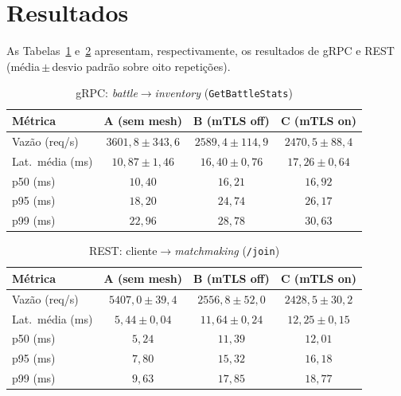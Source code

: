 \documentclass[12pt]{article}
\begin{document}
\section{Resultados}

As Tabelas~\ref{tab:grpc} e~\ref{tab:rest} apresentam, respectivamente, os resultados de gRPC e REST (m\'edia\,$\pm$\,desvio padr\~ao sobre oito repeti\c{c}\~oes).

\begin{table}[ht]
\centering
\caption{gRPC: \textit{battle}$\rightarrow$\textit{inventory} (\texttt{GetBattleStats})}
\label{tab:grpc}
\begin{tabular}{@{}lccc@{}}
\toprule
\textbf{M\'etrica} & \textbf{A (sem mesh)} & \textbf{B (mTLS off)} & \textbf{C (mTLS on)} \\
\midrule
Vaz\~ao (req/s)    & $3601{,}8 \pm 343{,}6$ & $2589{,}4 \pm 114{,}9$ & $2470{,}5 \pm 88{,}4$ \\
Lat.\ m\'edia (ms) & $10{,}87 \pm 1{,}46$   & $16{,}40 \pm 0{,}76$   & $17{,}26 \pm 0{,}64$ \\
p50 (ms)           & $10{,}40$              & $16{,}21$              & $16{,}92$ \\
p95 (ms)           & $18{,}20$              & $24{,}74$              & $26{,}17$ \\
p99 (ms)           & $22{,}96$              & $28{,}78$              & $30{,}63$ \\
\bottomrule
\end{tabular}
\end{table}

\begin{table}[ht]
\centering
\caption{REST: cliente$\rightarrow$\textit{matchmaking} (\texttt{/join})}
\label{tab:rest}
\begin{tabular}{@{}lccc@{}}
\toprule
\textbf{M\'etrica} & \textbf{A (sem mesh)} & \textbf{B (mTLS off)} & \textbf{C (mTLS on)} \\
\midrule
Vaz\~ao (req/s)    & $5407{,}0 \pm 39{,}4$ & $2556{,}8 \pm 52{,}0$ & $2428{,}5 \pm 30{,}2$ \\
Lat.\ m\'edia (ms) & $5{,}44 \pm 0{,}04$   & $11{,}64 \pm 0{,}24$  & $12{,}25 \pm 0{,}15$ \\
p50 (ms)           & $5{,}24$              & $11{,}39$             & $12{,}01$ \\
p95 (ms)           & $7{,}80$              & $15{,}32$             & $16{,}18$ \\
p99 (ms)           & $9{,}63$              & $17{,}85$             & $18{,}77$ \\
\bottomrule
\end{tabular}
\end{table}
\end{document}
